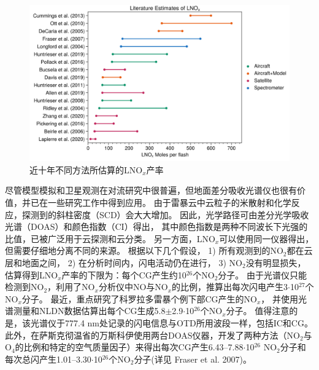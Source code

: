 \begin{figure}[htbp]
\centering
\includegraphics[width=35em]{./figures/lnox_production_xin.png}
\caption{近十年不同方法所估算的LNO$_x$产率 }
\label{figure:lnox_production_xin}
\end{figure}

尽管模型模拟和卫星观测在对流研究中很普遍，但地面差分吸收光谱仪也很有价值，并已在一些研究工作中得到应用。
由于雷暴云中云粒子的米散射和化学反应，探测到的斜柱密度（SCD）会大大增加\citep{Erle.1995,Pfeilsticker.1998,Winterrath.1999}。
因此，光学路径可由差分光学吸收光谱（DOAS）\citep{Veitel.1998,Wagner.1998}和颜色指数（CI）得出，
其中颜色指数是两种不同波长下光强的比值，已被广泛用于云探测和云分类\citep{Wagner.2014,Wang.2015,Wagner.2016}。
另一方面，LNO$_x$可以使用同一仪器得出，但需要仔细地分离不同的来源。
\citet{Noxon.1976}根据以下几个假设，
1) 所有观测到的NO$_2$都在云层和地面之间，
2) 在分析时间内，闪电活动仍在进行，
3) NO$_2$没有明显损失，估算得到LNO$_x$产率的下限为：每个CG产生约10$^{26}$个NO$_2$分子。
由于光谱仪只能检测到NO$_2$，\citet{Franzblau.1989}利用了NO$_x$分析仪中NO与NO$_x$的比例，推算出每次闪电产生3$\cdot$10$^{27}$个NO$_x$分子。
最近，\citet{Langford.2004}重点研究了科罗拉多雷暴个例下部CG产生的NO$_x$，
并使用光谱测量和NLDN数据估算出每个CG生成5.8$\pm$2.9$\cdot$10$^{26}$个NO$_x$分子。
值得注意的是，该光谱仪于777.4 nm处记录的闪电信息与OTD所用波段一样，包括IC和CG。
此外，在萨斯克彻温省的万斯科伊使用两台DOAS仪器，开发了两种方法（NO$_2$与O$_4$的比例和特定的空气质量因子）来得出每次CG产生6.43--7.88$\cdot$10$^{26}$ NO$_2$分子和每次总闪产生1.01--3.30$\cdot$10$^{26}$个NO$_2$分子(详见 Fraser et al. 2007)。


